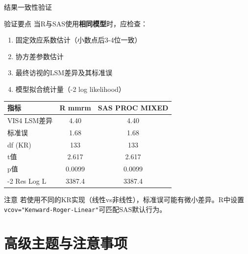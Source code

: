 \documentclass[aspectratio=169,11pt]{beamer}
\begin{document}
\begin{frame}{结果一致性验证}
\begin{block}{验证要点}
当R与SAS使用\textbf{相同模型}时，应检查：
\begin{enumerate}
    \item 固定效应系数估计（小数点后3-4位一致）
    \item 协方差参数估计
    \item 最终访视的LSM差异及其标准误
    \item 模型拟合统计量（-2 log likelihood）
\end{enumerate}
\end{block}

\vspace{0.1cm}
\begin{center}
\small
\begin{tabular}{lcc}
\toprule
\textbf{指标} & \textbf{R mmrm} & \textbf{SAS PROC MIXED} \\
\midrule
VIS4 LSM差异 & 4.40 & 4.40 \\
标准误 & 1.68 & 1.68 \\
df (KR) & 133 & 133 \\
t值 & 2.617 & 2.617 \\
p值 & 0.0099 & 0.0099 \\
-2 Res Log L & 3387.4 & 3387.4 \\
\bottomrule
\end{tabular}
\end{center}

\vspace{0.1cm}
\begin{alertblock}{注意}
若使用不同的KR实现（线性vs非线性），标准误可能有微小差异。R中设置\texttt{vcov="Kenward-Roger-Linear"}可匹配SAS默认行为。
\end{alertblock}
\end{frame}

\section{高级主题与注意事项}
\end{document}
